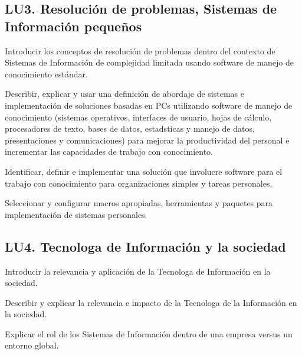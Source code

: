 \subsection{LU3. Resolución de problemas, Sistemas de Información pequeños}\label{sec:LU3}
\begin{LearningUnit}
\begin{LUGoal}
\item Introducir los conceptos de resolución de problemas dentro del contexto de Sistemas de Información de complejidad limitada usando software de manejo de conocimiento estándar.
\end{LUGoal}

\begin{LUObjective}
\item Describir, explicar y usar una definición de abordaje de sistemas e implementación de soluciones basadas en PCs utilizando software de manejo de conocimiento (sistemas operativos, interfaces de usuario, hojas de cálculo, procesadores de texto, bases de datos, estad­sticas y manejo de datos, presentaciones y comunicaciones) para mejorar la productividad del personal e incrementar las capacidades de trabajo con conocimiento.
\item Identificar, definir e implementar una solución que involucre software para el trabajo con conocimiento para organizaciones simples y tareas personales.
\item Seleccionar y configurar macros apropiadas, herramientas y paquetes para implementación de sistemas personales.
\end{LUObjective}
\end{LearningUnit}

\subsection{LU4. Tecnolog­a de Información y la sociedad}\label{sec:LU4}
\begin{LearningUnit}
\begin{LUGoal}
\item Introducir la relevancia y aplicación de la Tecnolog­a de Información en la sociedad.
\end{LUGoal}

\begin{LUObjective}
\item Describir y explicar la relevancia e impacto de la Tecnolog­a de la Información en la sociedad.
\item Explicar el rol de los Sistemas de Información dentro de una empresa versus un entorno global.
\end{LUObjective}
\end{LearningUnit}

